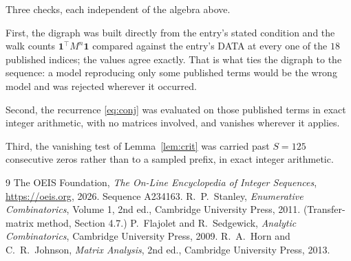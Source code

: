 \documentclass[11pt,a4paper]{article}
\theoremstyle{plain}
\theoremstyle{definition}
\begin{document}
Three checks, each independent of the algebra above.

First, the digraph was built directly from the entry's stated condition and the walk counts
$\mathbf{1}^{\!\top}M^{n}\mathbf{1}$ compared against the entry's DATA at every one of
the $18$ published indices; the values agree exactly. That is what ties the digraph to
the sequence: a model reproducing only some published terms would be the wrong model and
was rejected wherever it occurred.

Second, the recurrence \eqref{eq:conj} was evaluated on those published terms in exact
integer arithmetic, with no matrices involved, and vanishes wherever it applies.

Third, the vanishing test of Lemma~\ref{lem:crit} was carried past $S=125$ consecutive
zeros rather than to a sampled prefix, in exact integer arithmetic.

\begin{thebibliography}{9}
 The OEIS Foundation, \emph{The On-Line Encyclopedia of Integer
Sequences}, \url{https://oeis.org}, 2026. Sequence A234163.
 R.~P.~Stanley, \emph{Enumerative Combinatorics}, Volume 1, 2nd ed.,
Cambridge University Press, 2011. (Transfer-matrix method, Section 4.7.)
 P.~Flajolet and R.~Sedgewick, \emph{Analytic Combinatorics}, Cambridge
University Press, 2009.
 R.~A.~Horn and C.~R.~Johnson, \emph{Matrix Analysis}, 2nd ed., Cambridge
University Press, 2013.
\end{thebibliography}
\end{document}
